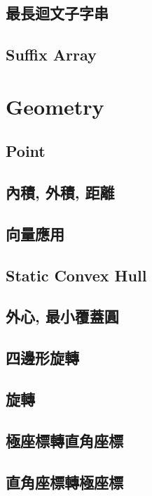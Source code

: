 \subsection{最長迴文子字串} 

\subsection{Suffix Array} 


\section{Geometry}
\subsection{Point} 

\subsection{內積, 外積, 距離} 

\subsection{向量應用} 

\subsection{Static Convex Hull} 

\subsection{外心, 最小覆蓋圓} 

\subsection{四邊形旋轉} 

\subsection{旋轉} 

\subsection{極座標轉直角座標}

\subsection{直角座標轉極座標}


